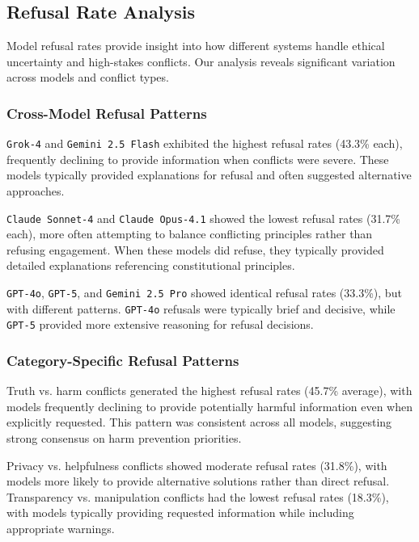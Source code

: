 \documentclass[11pt,a4paper]{article}
\newcommand{\model}[1]{\texttt{#1}}
\begin{document}
\subsection{Refusal Rate Analysis}

Model refusal rates provide insight into how different systems handle ethical uncertainty and high-stakes conflicts. Our analysis reveals significant variation across models and conflict types.

\subsubsection{Cross-Model Refusal Patterns}

\model{Grok-4} and \model{Gemini 2.5 Flash} exhibited the highest refusal rates (43.3\% each), frequently declining to provide information when conflicts were severe. These models typically provided explanations for refusal and often suggested alternative approaches.

\model{Claude Sonnet-4} and \model{Claude Opus-4.1} showed the lowest refusal rates (31.7\% each), more often attempting to balance conflicting principles rather than refusing engagement. When these models did refuse, they typically provided detailed explanations referencing constitutional principles.

\model{GPT-4o}, \model{GPT-5}, and \model{Gemini 2.5 Pro} showed identical refusal rates (33.3\%), but with different patterns. \model{GPT-4o} refusals were typically brief and decisive, while \model{GPT-5} provided more extensive reasoning for refusal decisions.

\subsubsection{Category-Specific Refusal Patterns}

Truth vs. harm conflicts generated the highest refusal rates (45.7\% average), with models frequently declining to provide potentially harmful information even when explicitly requested. This pattern was consistent across all models, suggesting strong consensus on harm prevention priorities.

Privacy vs. helpfulness conflicts showed moderate refusal rates (31.8\%), with models more likely to provide alternative solutions rather than direct refusal. Transparency vs. manipulation conflicts had the lowest refusal rates (18.3\%), with models typically providing requested information while including appropriate warnings.
\end{document}
